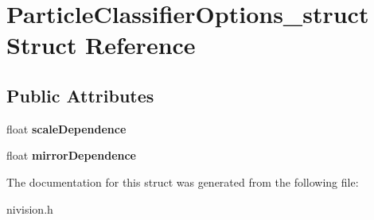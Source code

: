 \hypertarget{structParticleClassifierOptions__struct}{\section{\-Particle\-Classifier\-Options\-\_\-struct \-Struct \-Reference}
\label{structParticleClassifierOptions__struct}
}
\subsection*{\-Public \-Attributes}
\begin{DoxyCompactItemize}
\item 
\hypertarget{structParticleClassifierOptions__struct_a792a1326f881c22c9a3fc6a62882d969}{float {\bfseries scale\-Dependence}}\label{structParticleClassifierOptions__struct_a792a1326f881c22c9a3fc6a62882d969}

\item 
\hypertarget{structParticleClassifierOptions__struct_a794f85fc9d569be0a035dcacd467c588}{float {\bfseries mirror\-Dependence}}\label{structParticleClassifierOptions__struct_a794f85fc9d569be0a035dcacd467c588}

\end{DoxyCompactItemize}


\-The documentation for this struct was generated from the following file\-:\begin{DoxyCompactItemize}
\item 
nivision.\-h\end{DoxyCompactItemize}
